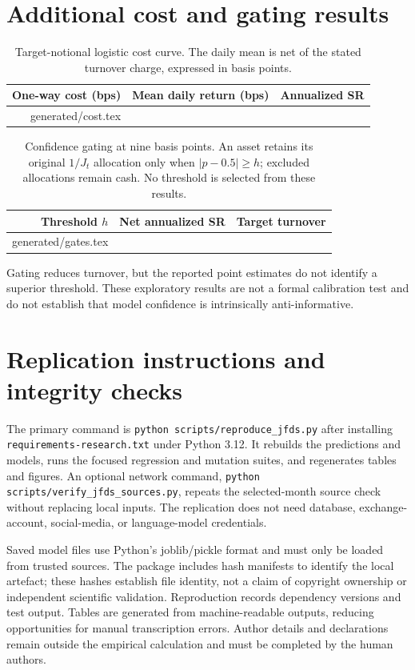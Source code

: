 \documentclass[preprint,12pt,authoryear]{elsarticle}
\makeatletter
\def\inputrows#1{\@@input #1 }
\makeatother
\begin{document}
\section{Additional cost and gating results}\label{app:sensitivity}
\begin{table}[H]\centering\small
\caption{Target-notional logistic cost curve. The daily mean is net of the stated turnover charge, expressed in basis points.}
\begin{tabular}{rrr}\toprule
One-way cost (bps) & Mean daily return (bps) & Annualized SR\\\midrule
\inputrows{generated/cost.tex}
\bottomrule\end{tabular}\end{table}
\begin{table}[H]\centering\small
\caption{Confidence gating at nine basis points. An asset retains its original $1/J_t$ allocation only when $|p-0.5|\geq h$; excluded allocations remain cash. No threshold is selected from these results.}
\begin{tabular}{rrr}\toprule
Threshold $h$ & Net annualized SR & Target turnover\\\midrule
\inputrows{generated/gates.tex}
\bottomrule\end{tabular}\end{table}
Gating reduces turnover, but the reported point estimates do not identify a superior threshold. These exploratory results are not a formal calibration test and do not establish that model confidence is intrinsically anti-informative.

\section{Replication instructions and integrity checks}
The primary command is \texttt{python scripts/reproduce\_jfds.py} after installing \texttt{requirements-research.txt} under Python 3.12. It rebuilds the predictions and models, runs the focused regression and mutation suites, and regenerates tables and figures. An optional network command, \texttt{python scripts/verify\_jfds\_sources.py}, repeats the selected-month source check without replacing local inputs. The replication does not need database, exchange-account, social-media, or language-model credentials.

Saved model files use Python's joblib/pickle format and must only be loaded from trusted sources. The package includes hash manifests to identify the local artefact; these hashes establish file identity, not a claim of copyright ownership or independent scientific validation. Reproduction records dependency versions and test output. Tables are generated from machine-readable outputs, reducing opportunities for manual transcription errors. Author details and declarations remain outside the empirical calculation and must be completed by the human authors.



\end{document}
